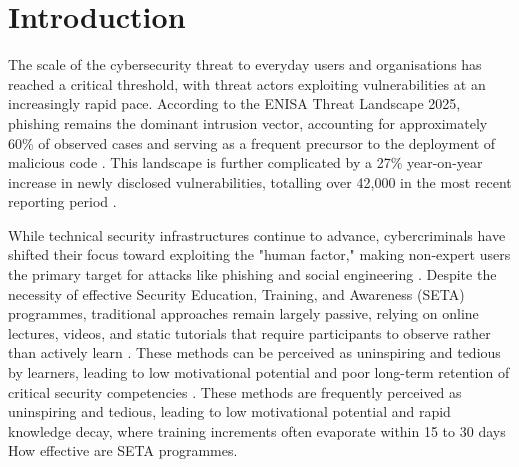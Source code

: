 \documentclass[sigconf, authorversion=true, nonacm=true]{acmart}%
\begin{document}



\maketitle

\section{Introduction}
The scale of the cybersecurity threat to everyday users and organisations has reached a critical threshold, with threat actors exploiting vulnerabilities at an increasingly rapid pace. According to the ENISA Threat Landscape 2025, phishing remains the dominant intrusion vector, accounting for approximately 60\% of observed cases and serving as a frequent precursor to the deployment of malicious code \cite{noauthor_threat_2025}. This landscape is further complicated by a 27\% year-on-year increase in newly disclosed vulnerabilities, totalling over 42,000 in the most recent reporting period \cite{noauthor_threat_2025}.


While technical security infrastructures continue to advance, cybercriminals have shifted their focus toward exploiting the "human factor," making non-expert users the primary target for attacks like phishing and social engineering \cite{keller_digital_2025}. Despite the necessity of effective Security Education, Training, and Awareness (SETA) programmes, traditional approaches remain largely passive, relying on online lectures, videos, and static tutorials that require participants to observe rather than actively learn \cite{keller_digital_2025, makri_digital_2021}. These methods can be perceived as uninspiring and tedious by learners, leading to low motivational potential and poor long-term retention of critical security competencies \cite{keller_digital_2025}. These methods are frequently perceived as uninspiring and tedious, leading to low motivational potential and rapid knowledge decay, where training increments often evaporate within 15 to 30 days How effective are SETA programmes.
\end{document}
